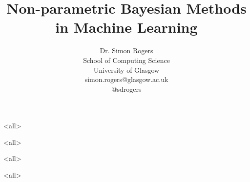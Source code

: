 \documentclass{beamer}
\title{Non-parametric Bayesian Methods in Machine Learning}
\author{Dr. Simon Rogers\\School of Computing Science\\University of Glasgow\\simon.rogers@glasgow.ac.uk\\@sdrogers}
\begin{document}
\mode<all>

\begin{frame}
	\titlepage
\end{frame}

\mode<all>



\mode<all>



\mode<all>


\end{document}
